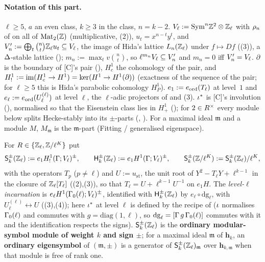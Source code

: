 \documentclass[11pt]{article}
\newcommand{\hcusp}{\mathbf{h}}                   %
\newcommand{\Zl}{\Z_\ell}
\begin{document}
\paragraph{Notation of this part.} $\ell\ge5$, $a$ an even class, $k\ge3$ in the class, $n=k-2$. $\Vcoef_\ell:=\Sym^{n}\Z^{2}\otimes\Zl$ with $\rho_n$ of
 on all of $\mathrm{Mat}_2(\mathbb{Z})$ (multiplicative, (2)), $u_t=x^{n-t}y^{t}$, and $V'_n:=\bigoplus_t\binom nt\Zl u_t\subseteq\Vcoef_\ell$,
the image of Hida's lattice $L_n(\Zl)$ under $f\mapsto Df$ ((3)), a $\Delta$-stable lattice (); $m_n:=\max_tv\binom nt$,
so $\ell^{m_n}V_\ell\subseteq V'_n$ and $m_n=0$ iff $V'_n=V_\ell$. $\partial$ is the boundary of [C]'s pair (), $H^{1}_c$ the cohomology of the
pair, and $H^{1}_{!}:=\operatorname{im}(H^{1}_c\to H^{1})=\ker(H^{1}\to H^{1}(\partial))$ (exactness of the sequence of the pair; for $\ell\ge5$ this is Hida's parabolic
cohomology $H^{1}_{P}$). $e_1:=e_{\mathrm{ord}}(T_\ell)$ at level~$1$ and $e_\ell:=e_{\mathrm{ord}}(U^{(\ell)}_\ell)$ at level $\ell$, the $\ell$-adic projectors of
 and (3). $\iota^{\ast}$ is [C]'s involution (), normalised so that the Eisenstein class lies in
$H^{1}_{+}$ (); for $2\in R^{\times}$ every module below splits Hecke-stably into its $\pm$-parts (, ).
For a maximal ideal $\mathfrak m$ and a module $M$, $M_{\mathfrak m}$ is the $\mathfrak m$-part (Fitting / generalised eigenspace).

\begin{definition}\label{def:u-msymk}
For $\cring\in\{\Zl,\Z/\ell^{K}\}$ put
\[
  \mathsf S^{\pm}_k(\Zl):=e_1H^{1}_{!}(\Ga;\Vcoef_\ell)^{\pm},\qquad \mathsf H^{\pm}_k(\Zl):=e_1H^{1}(\Ga;\Vcoef_\ell)^{\pm},\qquad
  \mathsf S^{\pm}_k(\Z/\ell^{K}):=\mathsf S^{\pm}_k(\Zl)/\ell^{K},
\]
with the operators $T_p$ ($p\ne\ell$) and $U:=u_{\mathrm{st}}$, the unit root of $Y^{2}-T_\ell Y+\ell^{k-1}$ in the closure of $\Zl[T_\ell]$ ((2),(3)),
so that $T_\ell=U+\ell^{k-1}U^{-1}$ on $e_1H$. The \emph{level-$\ell$ incarnation} is $e_\ell H^{1}(\Gamma_0(\ell);V_\ell)^{\pm}$, identified with $\mathsf H^{\pm}_k(\Zl)$
by $e_\ell\circ\mathrm{dg}_\ell$, with $U^{(\ell)}_\ell\leftrightarrow U$ ((3),(4)); here $\iota^{\ast}$ at level $\ell$ is defined by the recipe of  ($\iota$
normalises $\Gamma_0(\ell)$ and commutes with $g=\mathrm{diag}(1,\ell)$, so $\mathrm{dg}_\ell=[\Gamma\,g\,\Gamma_0(\ell)]$ commutes with it and the identification respects the signs). $\mathsf S^{\pm}_k(\Zl)$ is the \textbf{ordinary modular-symbol module of weight $k$ and sign $\pm$}; for a maximal ideal $\mathfrak m$
of $\hcusp_k$, an \textbf{ordinary eigensymbol} of $(\mathfrak m,\pm)$ is a generator of $\mathsf S^{\pm}_k(\Zl)_{\mathfrak m}$ over $\hcusp_{k,\mathfrak m}$ when that module is free of
rank one.
\end{definition}
\end{document}
